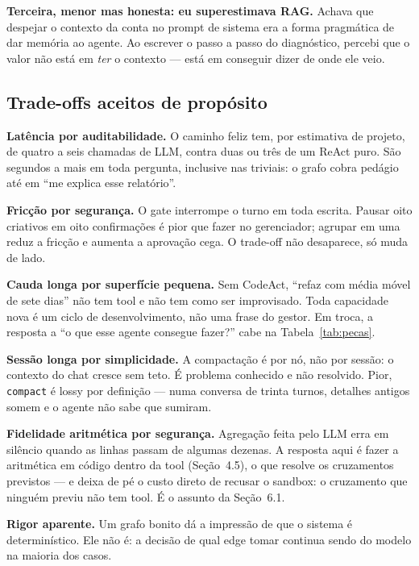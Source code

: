 \documentclass[10pt,twocolumn]{article}
\newcommand{\code}[1]{\texttt{\footnotesize #1}}
\begin{document}
\textbf{Terceira, menor mas honesta: eu superestimava RAG.} Achava que despejar o contexto
da conta no prompt de sistema era a forma pragmática de dar memória ao agente. Ao escrever
o passo a passo do diagnóstico, percebi que o valor não está em \emph{ter} o contexto ---
está em conseguir dizer de onde ele veio.

\subsection{Trade-offs aceitos de propósito}

\textbf{Latência por auditabilidade.} O caminho feliz tem, por estimativa de projeto, de
quatro a seis chamadas de LLM, contra duas ou três de um ReAct puro. São segundos a mais em
toda pergunta, inclusive nas triviais: o grafo cobra pedágio até em ``me explica esse
relatório''.

\textbf{Fricção por segurança.} O gate interrompe o turno em toda escrita. Pausar oito
criativos em oito confirmações é pior que fazer no gerenciador; agrupar em uma reduz a
fricção e aumenta a aprovação cega. O trade-off não desaparece, só muda de lado.

\textbf{Cauda longa por superfície pequena.} Sem CodeAct, ``refaz com média móvel de sete
dias'' não tem tool e não tem como ser improvisado. Toda capacidade nova é um ciclo de
desenvolvimento, não uma frase do gestor. Em troca, a resposta a ``o que esse agente
consegue fazer?'' cabe na Tabela~\ref{tab:pecas}.

\textbf{Sessão longa por simplicidade.} A compactação é por nó, não por sessão: o contexto
do chat cresce sem teto. É problema conhecido e não resolvido. Pior, \code{compact} é lossy
por definição --- numa conversa de trinta turnos, detalhes antigos somem e o agente não sabe
que sumiram.

\textbf{Fidelidade aritmética por segurança.} Agregação feita pelo LLM erra em silêncio
quando as linhas passam de algumas dezenas. A resposta aqui é fazer a aritmética em código
dentro da tool (Seção~4.5), o que resolve os cruzamentos previstos --- e deixa de pé o custo
direto de recusar o sandbox: o cruzamento que ninguém previu não tem tool. É o assunto da
Seção~6.1.

\textbf{Rigor aparente.} Um grafo bonito dá a impressão de que o sistema é determinístico.
Ele não é: a decisão de qual edge tomar continua sendo do modelo na maioria dos casos.

\end{document}
